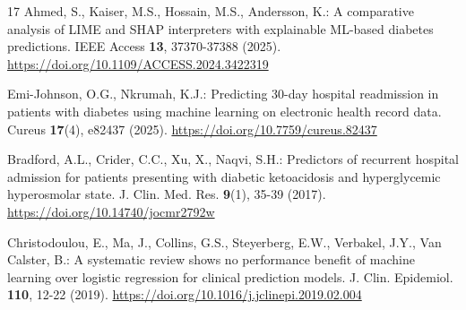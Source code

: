 \documentclass[pdflatex,sn-basic,Numbered]{sn-jnl}
\begin{document}
\begin{thebibliography}{17}
 Ahmed, S., Kaiser, M.S., Hossain, M.S., Andersson, K.: A comparative analysis of LIME and SHAP interpreters with explainable ML-based diabetes predictions. IEEE Access \textbf{13}, 37370-37388 (2025). \url{https://doi.org/10.1109/ACCESS.2024.3422319}

 Emi-Johnson, O.G., Nkrumah, K.J.: Predicting 30-day hospital readmission in patients with diabetes using machine learning on electronic health record data. Cureus \textbf{17}(4), e82437 (2025). \url{https://doi.org/10.7759/cureus.82437}

 Bradford, A.L., Crider, C.C., Xu, X., Naqvi, S.H.: Predictors of recurrent hospital admission for patients presenting with diabetic ketoacidosis and hyperglycemic hyperosmolar state. J. Clin. Med. Res. \textbf{9}(1), 35-39 (2017). \url{https://doi.org/10.14740/jocmr2792w}

 Christodoulou, E., Ma, J., Collins, G.S., Steyerberg, E.W., Verbakel, J.Y., Van Calster, B.: A systematic review shows no performance benefit of machine learning over logistic regression for clinical prediction models. J. Clin. Epidemiol. \textbf{110}, 12-22 (2019). \url{https://doi.org/10.1016/j.jclinepi.2019.02.004}

\end{thebibliography}
\end{document}
